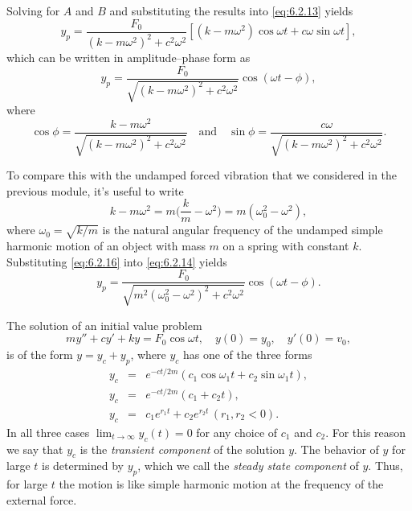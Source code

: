 \documentclass{ximera}
\begin{document}
 
 Solving  for $A$ and $B$
and substituting the results into  \eqref{eq:6.2.13} yields
$$
y_p=\frac{F_0}{(k-m\omega^2)^2+c^2\omega^2}
\left[(k-m\omega^2)\cos\omega t+c\omega\sin\omega t\right],
$$
which can be written in amplitude--phase form  as
\begin{equation}\label{eq:6.2.14} %
y_p=\frac{F_0}{\sqrt{(k-m\omega^2)^2+c^2\omega^2}}
\cos(\omega t-\phi),
\end{equation}
where
\begin{equation}\label{eq:6.2.15}
\cos\phi=\frac{k-m\omega^2}{\sqrt
{(k-m\omega^2)^2+c^2\omega^2}}\quad\mbox{and}\quad
\sin\phi=\frac{c\omega}{\sqrt{(k-m\omega^2)^2+c^2\omega^2}}.
\end{equation}
 
  To compare this with the undamped forced vibration
that we considered in the previous module, it's useful to write
\begin{equation}\label{eq:6.2.16}
k-m\omega^2=m\bigg(\frac{k}{m}-\omega^2\bigg)=
m(\omega_0^2-\omega^2),
\end{equation}
 where $\omega_0=\sqrt{k/m}$ is the natural
angular frequency of the undamped simple harmonic motion of an
object with mass $m$ on a spring with constant $k$.
Substituting  \eqref{eq:6.2.16} into  \eqref{eq:6.2.14} yields
\begin{equation}\label{eq:6.2.17}
y_p=\frac{F_0}{\sqrt{m^2(\omega^2_0-\omega^2)^2+
c^2\omega^2}}\cos(\omega t-\phi).
\end{equation}
 
The solution of an initial value problem
$$
my''+cy'+ky=F_0\cos\omega t, \quad  y(0)=y_0,\quad y'(0)=v_0,
$$
is of the form $y=y_c+y_p$,
where  $y_c$ has one of the three forms
\begin{eqnarray*}
y_c&=&e^{-ct/2m}(c_1\cos\omega_1t+c_2\sin\omega_1t),\\
 y_c&=&e^{-ct/2m}(c_1+c_2t),\\
y_c&=&c_1e^{r_1t}+c_2e^{r_2t}\,(r_1,r_2<0).
\end{eqnarray*}
In all three cases $\lim_{t\rightarrow\infty} y_c(t)=0$ for any choice of
$c_1$ and $c_2$. For this reason we say that $y_c$ is the \textit{transient component} of the solution $y$. The behavior of $y$ for
large $t$ is determined by $y_p$, which we call the \textit{steady state
component} of $y$. Thus, for large $t$ the motion is like simple
harmonic motion at the frequency of the external force.
 
\end{document}
